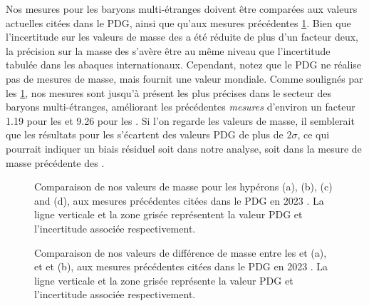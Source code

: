 Nos mesures pour les baryons multi-étranges doivent être comparées aux valeurs actuelles citées dans le PDG, ainsi que qu'aux mesures précédentes \figs\ref{fig:MassVsPDG}. Bien que l'incertitude sur les valeurs de masse des \rmOmegaPM a été réduite de plus d'un facteur deux, la précision sur la masse des \rmXiPM s'avère être au même niveau que l'incertitude tabulée dans les abaques internationaux. Cependant, notez que le PDG ne réalise pas de mesures de masse, mais fournit une valeur mondiale. Comme soulignés par les \figs\ref{fig:MassVsPDG}, nos mesures sont jusqu'à présent les plus précises dans le secteur des baryons multi-étranges, améliorant les précédentes \emph{mesures} d'environ un facteur 1.19 pour les \rmXiPM et 9.26 pour les \rmOmegaPM. Si l'on regarde les valeurs de masse, il semblerait que les résultats pour les \rmXiPM s'écartent des valeurs PDG de plus de $2\sigma$, ce qui pourrait indiquer un biais résiduel soit dans notre analyse, soit dans la mesure de masse précédente des \rmXiPM. 

\begin{figure}[!p]
\hspace*{-2cm}
\hspace*{-2cm}
\caption{Comparaison de nos valeurs de masse pour les hypérons \rmXiM (a), \rmAxiP (b), \rmOmegaM (c) and \rmAomegaP (d), aux mesures précédentes citées dans le PDG en 2023 \cite{particledatagroupReviewParticlePhysics2022}. La ligne verticale et la zone grisée représentent la valeur PDG et l'incertitude associée respectivement.}
	\label{fig:MassVsPDG}
\end{figure}

\begin{figure}[!h]
\hspace*{-2cm}
\caption{Comparaison de nos valeurs de différence de masse entre les \rmXiM et \rmAxiP (a), et \rmOmegaM et \rmAomegaP (b), aux mesures précédentes citées dans le PDG en 2023 \cite{particledatagroupReviewParticlePhysics2022}. La ligne verticale et la zone grisée représente la valeur PDG et l'incertitude associée respectivement.}
	\label{fig:MassDiffVsPDG}
\end{figure}

